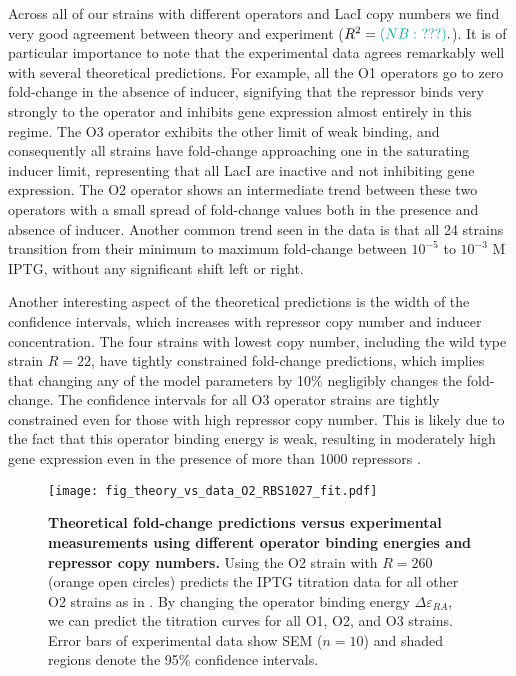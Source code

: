  Across all of our strains with different operators and LacI copy numbers we
find very good agreement between theory and experiment
($R^2=\nathanComment{???}.$). It is of particular importance to note that the experimental data agrees remarkably well with several theoretical predictions. For example, all the O1 operators go to zero fold-change in the absence
of inducer, signifying that the repressor binds very strongly to the operator
and inhibits gene expression almost entirely in this regime. The O3 operator
exhibits the other limit of weak binding, and consequently all strains have fold-change approaching one in the saturating inducer limit, representing that all LacI are inactive and not
inhibiting gene expression. The O2 operator shows an intermediate trend
between these two operators with a small spread of fold-change values both in
the presence and absence of inducer. Another common trend seen in the data is
that all 24 strains transition from their minimum to maximum fold-change
between $10^{-5}$ to $10^{-3} \,\, \text{M}$ IPTG, without any significant
shift left or right.

Another interesting aspect of the theoretical predictions is the width of the confidence intervals, which increases with repressor copy number and inducer concentration. The four strains with lowest copy number, including the wild type strain $R=22$, have tightly constrained fold-change predictions, which implies that changing any of the model parameters by 10\% negligibly changes the fold-change. The confidence intervals for all O3 operator strains are tightly constrained even for those with high repressor copy number. This is likely due to the fact that this operator binding energy is weak, resulting in moderately high gene expression even in the presence of more than 1000 repressors .

\begin{figure}[h!]
	\centering
	\texttt{[image: fig\_theory\_vs\_data\_O2\_RBS1027\_fit.pdf]}
	\caption{{\bf Theoretical fold-change predictions versus experimental measurements using different operator binding energies and repressor copy numbers.} Using the O2 strain with $R=260$ (orange open circles) predicts the IPTG titration data for all other O2 strains as in . By changing the operator binding energy $\Delta \varepsilon_{RA}$, we can predict the titration curves for all  O1,  O2, and  O3 strains. Error bars of experimental data show SEM ($n=10$) and shaded regions denote the 95\% confidence intervals.}
	\label{fig_result2}
\end{figure}

